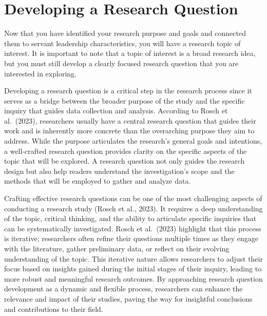 \documentclass[
  letterpaper,
  DIV=11,
  numbers=noendperiod]{scrreprt}
\begin{document}

\chapter*{Developing a Research
Question}\label{developing-a-research-question}


Now that you have identified your research purpose and goals and
connected them to servant leadership characteristics, you will have a
research topic of interest. It is important to note that a topic of
interest is a broad research idea, but you must still develop a clearly
focused research question that you are interested in exploring.

Developing a research question is a critical step in the research
process since it serves as a bridge between the broader purpose of the
study and the specific inquiry that guides data collection and analysis.
According to Rosch et al.~(2023), researchers usually have a central
research question that guides their work and is inherently more concrete
than the overarching purpose they aim to address. While the purpose
articulates the research's general goals and intentions, a well-crafted
research question provides clarity on the specific aspects of the topic
that will be explored. A research question not only guides the research
design but also help readers understand the investigation's scope and
the methods that will be employed to gather and analyze data.

Crafting effective research questions can be one of the most challenging
aspects of conducting a research study (Rosch et al., 2023). It requires
a deep understanding of the topic, critical thinking, and the ability to
articulate specific inquiries that can be systematically investigated.
Rosch et al.~(2023) highlight that this process is iterative;
researchers often refine their questions multiple times as they engage
with the literature, gather preliminary data, or reflect on their
evolving understanding of the topic. This iterative nature allows
researchers to adjust their focus based on insights gained during the
initial stages of their inquiry, leading to more robust and meaningful
research outcomes. By approaching research question development as a
dynamic and flexible process, researchers can enhance the relevance and
impact of their studies, paving the way for insightful conclusions and
contributions to their field.
\end{document}
